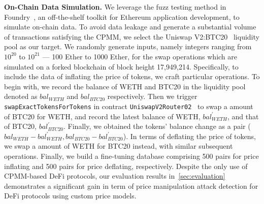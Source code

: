 \noindent
\textbf{On-Chain Data Simulation.}
We leverage the fuzz testing method in Foundry~\cite{Foundry}, an off-the-shelf toolkit for Ethereum application development, to simulate on-chain data.
To avoid data leakage and generate a substantial volume of transactions satisfying the CPMM, we select the Uniswap V2:BTC20~\cite{UniswapBTC20} liquidity pool as our target.
We randomly generate inputs, namely integers ranging from $10^{20}$ to $10^{21}$ --- 100 Ether to 1000 Ether, for the swap operations which are simulated on a forked blockchain of block height 17,949,214.
Specifically, to include the data of inflating the price of tokens, we craft particular operations.
To begin with, we record the balance of WETH and BTC20 in the liquidity pool denoted as $bal_{WETH}$ and $bal_{BTC20}$ respectively.
Then we trigger \texttt{swapExactTokensForTokens} in contract \texttt{UniswapV2Router02}~\cite{UniswapRouter} to swap a amount of BTC20 for WETH, and record the latest balance of WETH, $bal_{WETH}^{'}$, and that of BTC20, $bal_{BTC20}^{'}$.
Finally, we obtained the tokens' balance change as a pair ($bal_{WETH} - bal_{WETH}^{'}, bal_{BTC20} - bal_{BTC20}^{'}$).
In terms of deflating the price of tokens, we swap a amount of WETH for BTC20 instead, with similar subsequent operations.
Finally, we build a fine-tuning database comprising 500 pairs for price inflating and 500 pairs for price deflating, respectively.
Despite the only use of CPMM-based DeFi protocols, our evaluation results in~\mysec\ref{sec:evaluation} demonstrates a significant gain in term of price manipulation attack detection for DeFi protocols using custom price models.


